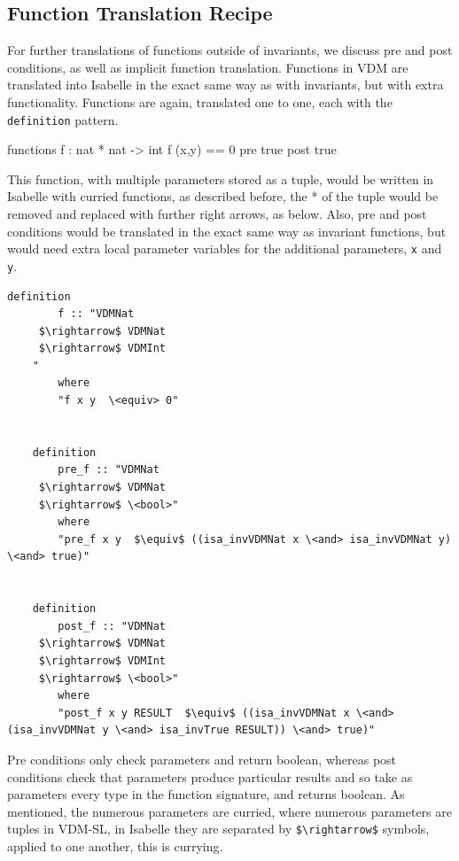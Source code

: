 	\subsection{Function Translation Recipe}
	For further translations of functions outside of invariants, we discuss pre and post conditions, as well as implicit function translation. Functions in VDM are translated into Isabelle in the exact same way as with invariants, but with extra functionality. Functions are again, translated one to one, each with the \lstinline[language=Isabelle, mathescape]{definition} pattern.
	\begin{vdmsl}
	functions
	f : nat * nat -> int
	f (x,y) == 0
	pre true
	post true
	\end{vdmsl}
	This function, with multiple parameters stored as a tuple, would be written in Isabelle with curried functions, as described before, the * of the tuple would be removed and replaced with further right arrows, as below. Also, pre and post conditions would be translated in the exact same way as invariant functions, but would need extra local parameter variables for the additional parameters, \lstinline[language=Isabelle, mathescape]{x} and \lstinline[language=Isabelle, mathescape]{y}.
	\begin{lstlisting}[language=Isabelle, mathescape]
	definition
		f :: "VDMNat
	 $\rightarrow$ VDMNat
	 $\rightarrow$ VDMInt
	"
	    where
	    "f x y  \<equiv> 0"


	definition
		pre_f :: "VDMNat
	 $\rightarrow$ VDMNat
	 $\rightarrow$ \<bool>"
	    where
	    "pre_f x y  $\equiv$ ((isa_invVDMNat x \<and> isa_invVDMNat y) \<and> true)"


	definition
		post_f :: "VDMNat
	 $\rightarrow$ VDMNat
	 $\rightarrow$ VDMInt
	 $\rightarrow$ \<bool>"
	    where
	    "post_f x y RESULT  $\equiv$ ((isa_invVDMNat x \<and> (isa_invVDMNat y \<and> isa_invTrue RESULT)) \<and> true)"
	\end{lstlisting}
	Pre conditions only check parameters and return boolean, whereas post conditions check that parameters produce particular results and so take as parameters every type in the function signature, and returns boolean. As mentioned, the numerous parameters are curried, where numerous parameters are tuples in VDM-SL, in Isabelle they are separated by \lstinline[language=Isabelle, mathescape]{$\rightarrow$} symbols, applied to one another, this is currying.

